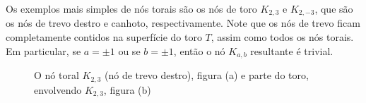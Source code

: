 	Os exemplos mais simples de nós torais são os nós de toro $K_{2,3}$ e $K_{2,-3}$, que 
	são os nós de trevo destro e canhoto, respectivamente. Note que os nós de trevo ficam 
	completamente contidos na superfície do toro $T$, assim como todos os nós torais. 
	Em particular, se $a = \pm1$ ou se $b = \pm1$, então o nó $K_{a,b}$ resultante é trivial.
	\begin{figure}[H]
        \centering
        \hfill
        \caption{O nó toral $K_{2,3}$ (nó de trevo destro), figura (a) e parte do toro, envolvendo $K_{2,3}$, figura (b)}
    \end{figure}
